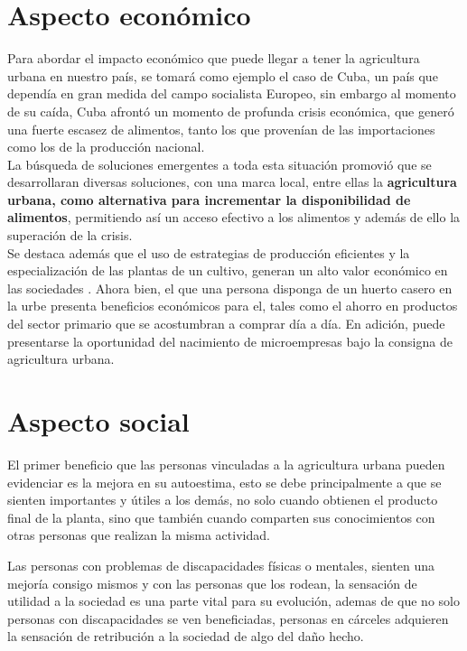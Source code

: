 \section{Aspecto económico}
Para abordar el impacto económico que puede llegar a tener la agricultura urbana en nuestro país, se tomará como ejemplo el caso de Cuba, un país que dependía en gran medida del campo socialista Europeo, sin embargo al momento de su caída, Cuba afrontó un momento de profunda crisis económica, que generó una fuerte escasez de alimentos, tanto los que provenían de las importaciones como los de la producción nacional. \\

La búsqueda de soluciones emergentes a toda esta situación promovió que se desarrollaran diversas soluciones, con una marca local, entre ellas la \textbf{agricultura urbana, como alternativa para incrementar la disponibilidad de alimentos}, permitiendo así un acceso efectivo a los alimentos y además de ello la superación de la crisis.\cite{houtart2004globalizacion}\\

Se destaca además que el uso de estrategias de producción eficientes y la especialización de las plantas de un cultivo, generan un alto valor económico en las sociedades\cite{civittolo2012extension} . Ahora bien, el que una persona disponga de un huerto casero en la urbe presenta beneficios económicos para el, tales como el ahorro en productos del sector primario que se acostumbran a comprar día a día. En adición, puede presentarse la oportunidad del nacimiento de microempresas bajo la consigna de agricultura urbana.

\section{Aspecto social}
El primer beneficio que las personas vinculadas a la agricultura urbana pueden evidenciar es la mejora en su autoestima, esto se debe principalmente a que se sienten importantes y útiles a los demás, no solo cuando obtienen el producto final de la planta, sino que también cuando comparten sus conocimientos con otras personas que realizan la misma actividad.

Las personas con problemas de discapacidades físicas o mentales, sienten una mejoría consigo mismos y con las personas que los rodean, la sensación de utilidad a la sociedad es una parte vital para su evolución, ademas de que no solo personas con discapacidades se ven beneficiadas, personas en cárceles adquieren la sensación de retribución a la sociedad de algo del daño hecho.

